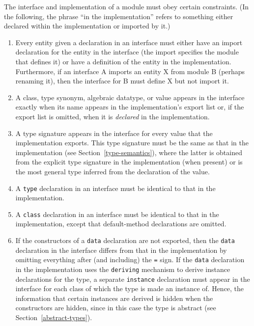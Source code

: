 The interface and implementation of a module must obey certain
constraints.
(In the following,
the phrase ``in the implementation'' refers to something
either declared within the implementation or imported by it.)
\begin{enumerate}
\item
Every entity given a declaration in an interface must either have an
import declaration for the entity in the interface (the import
specifies the module that defines it) or have a definition of the
entity in the implementation.  Furthermore, if an interface A imports
an entity X from module B (perhaps renaming it), then the interface
for B must define X but not import it.

\item
A class, type synonym, algebraic datatype, or value appears in the
interface exactly when its name appears in the implementation's export
list or, if the export list is omitted, when it is {\em declared} in
the implementation.

\item
A type signature appears in the interface for every value that the
implementation exports.  
This
type signature must be the same as that 
in the implementation (see Section~\ref{type-semantics}), where
the latter is obtained from the explicit type signature in the
implementation (when present) or is the most general type
inferred from the declaration of the value.

\item
A \mbox{\tt type} declaration in an
interface must be identical to that in the implementation.

\item
A \mbox{\tt class} declaration in an
interface must be identical to that in the implementation, except that
default-method declarations are omitted.

\item
If the constructors of a \mbox{\tt data} declaration are not exported, 
then the \mbox{\tt data} declaration in the interface differs from that in the
implementation by omitting everything after (and including) the \mbox{\tt =}
sign.  If the \mbox{\tt data} declaration in the implementation uses the
\mbox{\tt deriving} mechanism to derive instance declarations for the type, a
separate \mbox{\tt instance} declaration must appear in the interface for each
class of which the type is made an instance of.  Hence, the
information that certain instances are derived is hidden when the
constructors are hidden, since in this case the type is abstract (see
Section~\ref{abstract-types}).


\end{enumerate}
